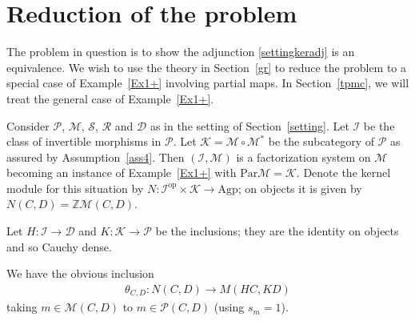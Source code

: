 \documentclass[a4paper,12pt,reqno]{amsart}
\theoremstyle{definition}
\theoremstyle{fact}
\theoremstyle{genquest}
\theoremstyle{step}
\newcommand{\dd}{\colon}
\newcommand{\ra}{\rightarrow}
\def\CD{{\mathscr D}}
\def\CI{{\mathscr I}}
\def\CK{{\mathscr K}}
\def\CM{{\mathscr M}}
\def\CP{{\mathscr P}}
\def\CR{{\mathscr R}}
\def\CS{{\mathscr S}}
\begin{document}
\section{Reduction of the problem}\label{reducto}

The problem in question is to show the adjunction \eqref{settingkeradj} is an equivalence. 
We wish to use the theory in Section~\ref{gr} to reduce the problem to a special 
case of Example~\ref{Ex1+} involving partial maps. In Section~\ref{tpmc}, we
will treat the general case of Example~\ref{Ex1+}. 

Consider $\CP$, $\CM$, $\CS$, $\CR$ and $\CD$ as in the setting of Section~\ref{setting}.
Let $\CI$ be the class of invertible morphisms in $\CP$.
Let $\CK = \CM\circ \CM^*$ be the subcategory of $\CP$ as assured by 
Assumption~\ref{ass4}.
Then $(\CI,\CM)$ is a factorization system on $\CM$ becoming an instance of 
Example~\ref{Ex1+} with $\mathrm{Par}\CM = \CK$.
Denote the kernel module for this situation by 
$N \dd \CI^{\mathrm{op}} \times \CK \ra \mathrm{Agp}$;
on objects it is given by $N(C,D) = \mathbb{Z}\CM(C,D)$.  

Let $H\dd \CI \ra \CD$ and $K\dd \CK \ra \CP$ be the inclusions;
they are the identity on objects and so Cauchy dense. 

We have the obvious inclusion  
\begin{eqnarray}\label{specialtheta}
\theta_{C,D} \dd N(C,D) \ra M(HC,KD)
\end{eqnarray}
taking $m\in \CM(C,D)$ to $m \in \CP(C,D)$ (using $s_m = 1$).
\end{document}
